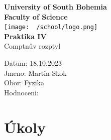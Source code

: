 \documentclass{article}
\begin{document}
\begin{center}
\textbf{\Huge{University of South Bohemia}}\\
\vspace{50px}
\textbf{\Large{Faculty of Science}} \\
\vspace{30px}
\texttt{[image: ~/school/logo.png]} \\
\vspace{30px}
\textbf{\large{Praktika IV}}
\vspace{20px}
\\
\vspace{20px}
\large{Comptnův rozptyl} \\
\vspace{60px}
\end{center}
\begin{flushleft}
Datum: 18.10.2023 \\
Jmeno: Martin Skok \\
Obor: Fyzika \\
Hodnoceni:
\end{flushleft}
\newpage
\section{Úkoly}
\section{}
\end{document}
